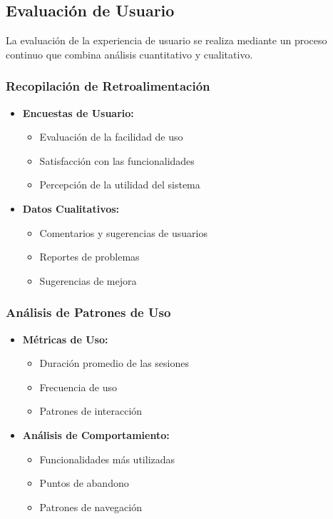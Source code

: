 \subsection{Evaluación de Usuario}
\label{evaluacion-usuario}

La evaluación de la experiencia de usuario se realiza mediante un proceso continuo que combina análisis cuantitativo y cualitativo.

\subsubsection{Recopilación de Retroalimentación}

\begin{itemize}
	\item \textbf{Encuestas de Usuario:}
	      \begin{itemize}
		      \item Evaluación de la facilidad de uso
		      \item Satisfacción con las funcionalidades
		      \item Percepción de la utilidad del sistema
	      \end{itemize}

	\item \textbf{Datos Cualitativos:}
	      \begin{itemize}
		      \item Comentarios y sugerencias de usuarios
		      \item Reportes de problemas
		      \item Sugerencias de mejora
	      \end{itemize}
\end{itemize}

\subsubsection{Análisis de Patrones de Uso}

\begin{itemize}
	\item \textbf{Métricas de Uso:}
	      \begin{itemize}
		      \item Duración promedio de las sesiones
		      \item Frecuencia de uso
		      \item Patrones de interacción
	      \end{itemize}

	\item \textbf{Análisis de Comportamiento:}
	      \begin{itemize}
		      \item Funcionalidades más utilizadas
		      \item Puntos de abandono
		      \item Patrones de navegación
	      \end{itemize}
\end{itemize}

